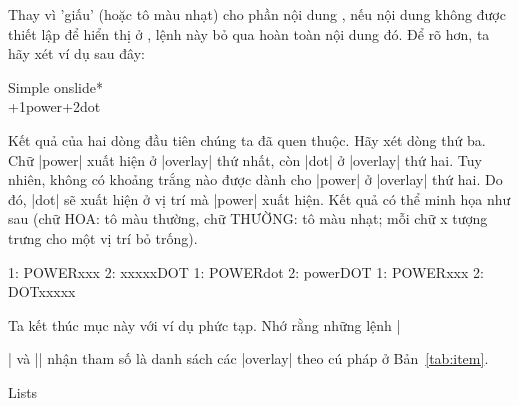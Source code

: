 \DescribeMacro{\onslide*}
Thay vì 'giấu' (hoặc tô màu nhạt) cho phần nội dung ,
nếu nội dung  không được thiết lập để hiển thị ở ,
lệnh này bỏ qua hoàn toàn nội dung đó. Để rõ hơn, ta hãy xét ví dụ sau đây:
\begin{example}
 \begin{slide}{Simple onslide*}
   \\
   \onslide+{1}{power}\onslide+{2}{dot}\\
 \end{slide}
\end{example}
Kết quả của hai dòng đầu tiên chúng ta đã quen thuộc. Hãy xét dòng thứ ba.
Chữ |power| xuất hiện ở |overlay| thứ nhất, còn |dot| ở |overlay| thứ hai.
Tuy nhiên, không có khoảng trắng nào được dành cho |power| ở |overlay| thứ
hai. Do đó, |dot| sẽ xuất hiện ở vị trí mà |power| xuất hiện. Kết quả có
thể minh họa như sau (chữ HOA: tô màu thường, chữ THƯỜNG: tô màu nhạt;
mỗi chữ x tượng trưng cho một vị trí bỏ trống).
\begin{example}
  1: POWERxxx   2: xxxxxDOT
  1: POWERdot   2: powerDOT
  1: POWERxxx   2: DOTxxxxx
\end{example}
Ta kết thúc mục này với ví dụ phức tạp. Nhớ rằng những lệnh
|\item| và |\onslide| nhận tham số  là danh sách
các |overlay| theo cú pháp ở Bản~\vref{tab:item}.
\begin{example}
 \begin{slide}{Lists}
   \par
   \par
   \par
   \par
 \end{slide}
\end{example}

